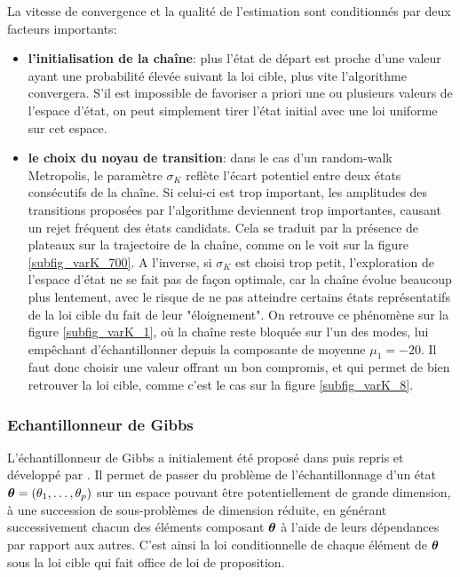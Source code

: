 La vitesse de convergence et la qualité de l'estimation sont conditionnés par deux facteurs importants: 
\begin{itemize}
	\item \textbf{l'initialisation de la chaîne}: plus l'état de départ est proche d'une valeur ayant une probabilité élevée suivant la loi cible, plus vite l'algorithme convergera. S'il est impossible de favoriser a priori une ou plusieurs valeurs de l'espace d'état, on peut simplement tirer l'état initial avec une loi uniforme sur cet espace.
	\item \textbf{le choix du noyau de transition}: dans le cas d'un random-walk Metropolis, le paramètre $\sigma_K$ reflète l'écart potentiel entre deux états consécutifs de la chaîne. Si celui-ci est trop important, les amplitudes des transitions proposées par l'algorithme deviennent trop importantes, causant un rejet fréquent des états candidats. Cela se traduit par la présence de plateaux sur la trajectoire de la chaîne, comme on le voit sur la figure \ref{subfig_varK_700}. A l'inverse, si $\sigma_K$ est choisi trop petit, l'exploration de l'espace d'état ne se fait pas de façon optimale, car la chaîne évolue beaucoup plus lentement, avec le risque de ne pas atteindre certains états représentatifs de la loi cible du fait de leur "éloignement". On retrouve ce phénomène sur la figure \ref{subfig_varK_1}, où la chaîne reste bloquée sur l'un des modes, lui empêchant d'échantillonner depuis la composante de moyenne $\mu_1 = -20$. Il faut donc choisir une valeur offrant un bon compromis, et qui permet de bien retrouver la loi cible, comme c'est le cas sur la figure \ref{subfig_varK_8}. 
\end{itemize}

\subsubsection{Echantillonneur de Gibbs}
L'échantillonneur de Gibbs a initialement été proposé dans \cite{Geman1984} puis repris et développé par \cite{Gelfand1990}. Il permet de passer du problème de l'échantillonnage d'un état ${\bm{\theta}} = (\theta_1, \dots, \theta_p)$ sur un espace pouvant être potentiellement de grande dimension, à une succession de sous-problèmes {de dimension réduite}, en générant successivement chacun des éléments composant ${\bm{\theta}}$ à l'aide de leurs dépendances par rapport aux autres. C'est ainsi la loi conditionnelle de chaque élément de ${\bm{\theta}}$ sous la loi cible qui fait office de loi de proposition.

